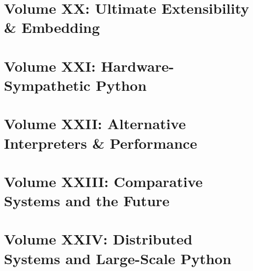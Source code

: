 \documentclass[11pt, a4paper, openany]{book}
\begin{document}
\part{Volume XX: Ultimate Extensibility \& Embedding}







\part{Volume XXI: Hardware-Sympathetic Python}



\part{Volume XXII: Alternative Interpreters \& Performance}


\part{Volume XXIII: Comparative Systems and the Future}


\part{Volume XXIV: Distributed Systems and Large-Scale Python}



\end{document}
